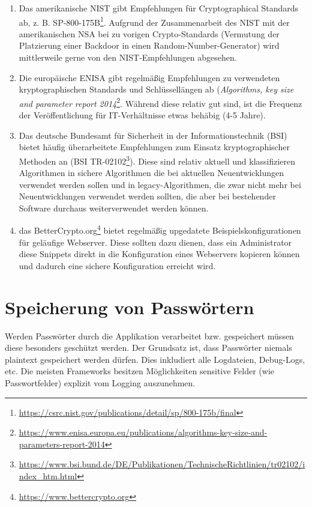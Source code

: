 \begin{enumerate}
	\item Das amerikanische NIST gibt Empfehlungen für Cryptographical Standards ab, z. B. SP-800-175B\footnote{\url{https://csrc.nist.gov/publications/detail/sp/800-175b/final}}. Aufgrund der Zusammenarbeit des NIST mit der amerikanischen NSA bei zu vorigen Crypto-Standards (Vermutung der Platzierung einer Backdoor in einen Random-Number-Generator) wird mittlerweile gerne von den NIST-Empfehlungen abgesehen.
	\item Die europäische ENISA gibt regelmäßig Empfehlungen zu verwendeten kryptographischen Standards und Schlüssellängen ab (\textit{Algorithms, key size and parameter report 2014}\footnote{\url{https://www.enisa.europa.eu/publications/algorithms-key-size-and-parameters-report-2014}}. Während diese relativ gut sind, ist die Frequenz der Veröffentlichung für IT-Verhältnisse etwas behäbig (4-5 Jahre).
	\item Das deutsche Bundesamt für Sicherheit in der Informationstechnik (BSI) bietet häufig überarbeitete Empfehlungen zum Einsatz kryptographischer Methoden an (BSI TR-02102\footnote{\url{https://www.bsi.bund.de/DE/Publikationen/TechnischeRichtlinien/tr02102/index_htm.html}}). Diese sind relativ aktuell und klassifizieren Algorithmen in sichere Algorithmen die bei aktuellen Neuentwicklungen verwendet werden sollen und in legacy-Algorithmen, die zwar nicht mehr bei Neuentwicklungen verwendet werden sollten, die aber bei bestehender Software durchaus weiterverwendet werden können.
	\item das BetterCrypto.org\footnote{\url{https://www.bettercrypto.org}} bietet regelmäßig upgedatete Beispielskonfigurationen für geläufige Webserver. Diese sollten dazu dienen, dass ein Administrator diese Snippets direkt in die Konfiguration eines Webservers kopieren können und dadurch eine sichere Konfiguration erreicht wird.
\end{enumerate}

\chapter{Speicherung von Passwörtern}
\label{password_storage}

Werden Passwörter durch die Applikation verarbeitet bzw. gespeichert müssen diese besonders geschützt werden. Der Grundsatz ist, dass Passwörter niemals plaintext gespeichert werden dürfen. Dies inkludiert alle Logdateien, Debug-Logs, etc. Die meisten Frameworks besitzen Möglichkeiten sensitive Felder (wie Passwortfelder) explizit vom Logging auszunehmen.

